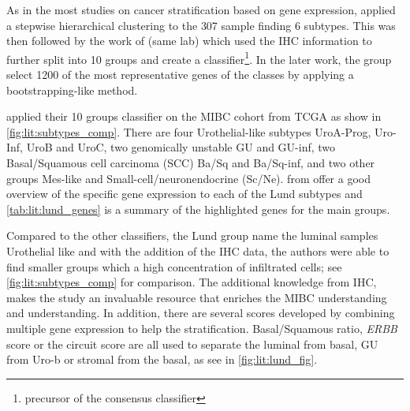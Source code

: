 As in the most studies on cancer stratification based on gene expression, \citet{Sjodahl2017-xr} applied a stepwise hierarchical clustering to the 307 sample finding 6 subtypes. This was then followed by the work of \citet{Marzouka2018-ge} (same lab) which used the IHC information to further split into 10 groups and create a classifier\footnote{precursor of the consensus classifier}. In the later work, the group select 1200 of the most representative genes of the classes by applying a bootstrapping-like method.

\citet{Marzouka2018-ge} applied their 10 groups classifier on the MIBC cohort from TCGA as show in \cref{fig:lit:subtypes_comp}. There are four Urothelial-like subtypes UroA-Prog, Uro-Inf, UroB and UroC, two genomically unstable GU and GU-inf, two Basal/Squamous cell carcinoma (SCC) Ba/Sq and Ba/Sq-inf, and two other groups Mes-like and Small-cell/neuronendocrine (Sc/Ne).  from \citet{Marzouka2018-ge} offer a good overview of the specific gene expression to each of the Lund subtypes and \cref{tab:lit:lund_genes} is a summary of the highlighted genes for the main groups.


Compared to the other classifiers, the Lund group name the luminal samples Urothelial like and with the addition of the IHC data, the authors were able to find smaller groups which a high concentration of infiltrated cells; see \cref{fig:lit:subtypes_comp} for comparison. The additional knowledge from IHC, makes the study an invaluable resource that enriches the MIBC understanding and understanding. In addition, there are several scores developed by combining multiple gene expression to help the stratification. Basal/Squamous ratio, \textit{ERBB} score or the circuit score are all used to separate the luminal from basal, GU from Uro-b or stromal from the basal, as see in \cref{fig:lit:lund_fig}.


